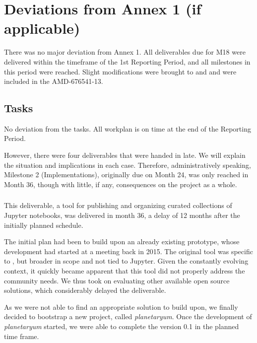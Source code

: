 \section{Deviations from Annex 1 (if applicable)}

There was no major deviation from Annex 1. All deliverables due for M18 were delivered
  within the timeframe of the 1st Reporting Period, and all milestones in this period were
  reached.  Slight modifications were brought to  and  and were
  included in the AMD-676541-13.

\subsection{Tasks}

No deviation from the tasks. All workplan is on time at the end of the Reporting
Period.

However, there were four deliverables that
were handed in late. We will explain the situation and implications in
each case. Therefore, administratively speaking, Milestone 2
(Implementations), originally due on Month 24, was only reached in
Month 36, though with little, if any, consequences on the project as a
whole.

\subsubsection{\protect{}}
This deliverable, a tool for publishing and organizing curated
collections of Jupyter notebooks, was delivered in month 36, a delay
of 12 months after the initially planned schedule.

The initial plan had been to build upon an already existing prototype,
whose development had started at a \Sage meeting back in 2015. The
original tool was specific to \Sage, but broader in scope and not tied
to Jupyter. Given the constantly evolving context, it quickly became
apparent that this tool did not properly address the community needs.
We thus took on evaluating other available open source solutions,
which considerably delayed the deliverable.

As we were not able to find an appropriate solution to build upon, we
finally decided to bootstrap a new project, called
\emph{planetaryum}. Once the development of \emph{planetaryum}
started, we were able to complete the version 0.1 in the planned
time frame.


